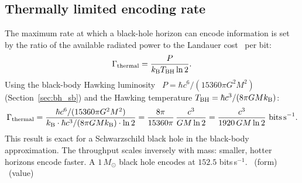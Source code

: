 \subsection{Thermally limited encoding rate}
The maximum rate at which a black-hole horizon can encode information is set by the ratio of the available radiated power to the Landauer cost~\cite{Landauer1961} per
bit:
\begin{equation}
\Gamma_{\rm thermal}=\frac{P}{k_{\mathrm B} T_{\rm BH}\ln2}.\label{eq:bh_gamma_def}
\end{equation}
Using the black-body Hawking luminosity~\cite{Hawking1975} $P=\hbar c^6/(15360\pi G^2M^2)$ (Section~\ref{sec:bh_sb}) and the Hawking temperature $T_{\rm BH}=\hbar c^3/(8\pi GMk_{\mathrm B})$:
\begin{equation}
\Gamma_{\rm thermal}=\frac{\hbar c^6/(15360\pi G^2M^2)}{\kB\cdot\hbar c^3/(8\pi GM\kB)\cdot\ln2}=\frac{8\pi}{15360\pi}\,\frac{c^3}{GM\ln2}=\frac{c^3}{1920\,GM\ln2}\ \text{bits\,s}^{-1}.\label{eq:bh_gamma}
\end{equation}
This result is exact for a Schwarzschild black hole in the black-body approximation. The throughput scales inversely with mass: smaller, hotter horizons
encode faster. A $1\,M_\odot$ black hole encodes at $152.5$ bits\,s$^{-1}$. \derived\ (form) \calc\ (value)


